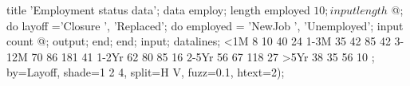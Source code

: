 \begin{listing}
title 'Employment status data';
data employ;
   length employed $10;
   input length $ @;
   do layoff ='Closure ', 'Replaced';
      do employed = 'NewJob   ', 'Unemployed';
         input count @;
         output;
         end;
      end;
   input;
datalines;
<1M       8   10     40   24
1-3M     35   42     85   42
3-12M    70   86    181   41
1-2Yr    62   80     85   16
2-5Yr    56   67    118   27
>5Yr     38   35     56   10
;
    by=Layoff, shade=1 2 4, split=H V, fuzz=0.1, htext=2);

\end{listing}
